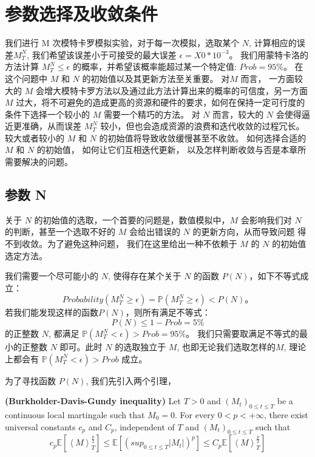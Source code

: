 \chapter{参数选择及收敛条件}
\label{chp:3}
我们进行 M 次模特卡罗模拟实验，对于每一次模拟，选取某个 $N$, 计算相应的误差$M_T^N$, 我们希望该误差小于可接受的最大误差 $\epsilon=X0*10^{-3}$。 
我们用蒙特卡洛的方法计算 $M_T^N\leq \epsilon$ 的概率，并希望该概率能超过某一个特定值: $Prob=95\%$。 
在这个问题中 $M$ 和 $N$ 的初始值以及其更新方法至关重要。 对$M$ 而言， 一方面较大的 $M$ 会增大模特卡罗方法以及通过此方法计算出来的概率的可信度，另一方面
$M$ 过大，将不可避免的造成更高的资源和硬件的要求，如何在保持一定可行度的条件下选择一个较小的 $M$ 需要一个精巧的方法。
对 $N$ 而言，较大的 $N$ 会使得逼近更准确，从而误差 $M_T^N$ 较小，但也会造成资源的浪费和迭代收敛的过程冗长。
较大或者较小的 $M$ 和 $N$ 的初始值将导致收敛缓慢甚至不收敛。
如何选择合适的 $M$ 和 $N$ 的初始值，
如何让它们互相迭代更新， 以及怎样判断收敛与否是本章所需要解决的问题。
\section{参数 N} %
\label{sec:N}
关于 $N$ 的初始值的选取，一个首要的问题是，数值模拟中，$M$ 会影响我们对 $N$ 的判断，甚至一个选取不好的 $M$ 会给出错误的 $N$ 的更新方向，从而导致问题
得不到收敛。为了避免这种问题， 我们在这里给出一种不依赖于 $M$ 的 $N$ 的初始值选定方法。

我们需要一个尽可能小的 $N$, 使得存在某个关于 $N$ 的函数 $P(N)$，如下不等式成立：
\begin{equation}
Probability(M_T^N\geq\epsilon)=\mathbb{P}(M_T^N\geq\epsilon)<P(N)。
\end{equation}
若我们能发现这样的函数$P(N)$，则所有满足不等式：
\begin{equation}
P(N)\leq 1-Prob=5\% 
\end{equation}
的正整数 $N$, 都满足 $\mathbb{P}(M_T^N<\epsilon)>Prob=95\%$。
我们只需要取满足不等式的最小的正整数 $N$ 即可。此时 $N$ 的选取独立于 $M$, 也即无论我们选取怎样的$M$, 理论上都会有 $\mathbb{P}(M_T^N<\epsilon)>Prob$ 成立。

为了寻找函数 $P(N)$, 我们先引入两个引理，

\textbf{(Burkholder-Davis-Gundy inequality)}
Let $T>0$ and $(M_t)_{0\leq t\leq T}$ be a continuous local martingale such that $M_0=0$. For every $0<p<+\infty$, there exist universal constants $c_p$ and $C_p$, independent of $T$ and $(M_t)_{0\leq t\leq T}$ such that 
\begin{equation}
c_p\mathbb{E}[\left \langle M \right \rangle_T^{\frac{p}{2}}]\leq \mathbb{E}[(sup_{0\leq t\leq T}|M_t|)^p]\leq C_p\mathbb{E}[\left \langle M \right \rangle_T^{\frac{p}{2}}]
\end{equation}

